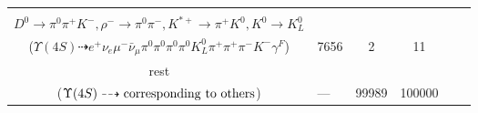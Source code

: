 \documentclass[landscape]{article}
\newcounter{rownumbers}
\newcommand\rn{\stepcounter{rownumbers}\arabic{rownumbers}}
\newcommand{\EOLP}{\\ \hline} %
\newcommand{\topoTags}[1]{#1} %
\begin{document}
\begin{longtable}{clcccc}
\rn & \makecell[l]{ $ 
\Upsilon(4S) \rightarrow B^{+} B^{-} ,
B^{+} \rightarrow e^{+} \nu_{e} \bar{D}^{*0} \gamma^{F} ,
B^{-} \rightarrow \mu^{-} \bar{\nu}_{\mu} D^{*0} ,
\bar{D}^{*0} \rightarrow \pi^{0} \bar{D}^{0} ,
D^{*0} \rightarrow \pi^{0} D^{0} ,
\bar{D}^{0} \rightarrow \rho^{-} K^{*+} ,
$ \\ $
D^{0} \rightarrow \pi^{0} \pi^{+} K^{-} ,
\rho^{-} \rightarrow \pi^{0} \pi^{-} ,
K^{*+} \rightarrow \pi^{+} K^{0} ,
K^{0} \rightarrow K_{L}^{0} 
$ \\ ($
\Upsilon(4S) \dashrightarrow e^{+} \nu_{e} \mu^{-} \bar{\nu}_{\mu} \pi^{0} \pi^{0} \pi^{0} \pi^{0} K_{L}^{0} \pi^{+} \pi^{+} \pi^{-} K^{-} \gamma^{F} 
$) } & \topoTags{7656 & }2 & 11 \EOLP

rest & \makecell[l]{ $ 
\Upsilon(4S) \rightarrow \rm{others \  (99963 \  in \  total)}
$ \\ ($
\Upsilon(4S) \dashrightarrow \rm{corresponding\ to\ others}
$) } & \topoTags{--- & }99989 & 100000 \\ \hline

\end{longtable}
\end{document}

